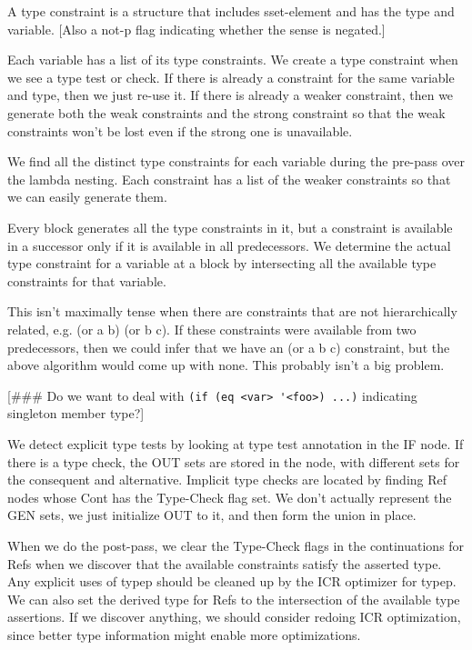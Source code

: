 A type constraint is a structure that includes sset-element and has
the type and variable. [Also a not-p flag indicating whether the sense
is negated.]

Each variable has a list of its type constraints. We create a type
constraint when we see a type test or check. If there is already a
constraint for the same variable and type, then we just re-use it. If
there is already a weaker constraint, then we generate both the weak
constraints and the strong constraint so that the weak constraints
won't be lost even if the strong one is unavailable.

We find all the distinct type constraints for each variable during the pre-pass
over the lambda nesting.  Each constraint has a list of the weaker constraints
so that we can easily generate them.

Every block generates all the type constraints in it, but a constraint is
available in a successor only if it is available in all predecessors.  We
determine the actual type constraint for a variable at a block by intersecting
all the available type constraints for that variable.

This isn't maximally tense when there are constraints that are not
hierarchically related, e.g. (or a b) (or b c).  If these constraints were
available from two predecessors, then we could infer that we have an (or a b c)
constraint, but the above algorithm would come up with none.  This probably
isn't a big problem.

[\#\#\# Do we want to deal with \verb+(if (eq <var> '<foo>) ...)+ indicating singleton
member type?]

We detect explicit type tests by looking at type test annotation in the IF
node.  If there is a type check, the OUT sets are stored in the node, with
different sets for the consequent and alternative.  Implicit type checks are
located by finding Ref nodes whose Cont has the Type-Check flag set.  We don't
actually represent the GEN sets, we just initialize OUT to it, and then form
the union in place.

When we do the post-pass, we clear the Type-Check flags in the continuations
for Refs when we discover that the available constraints satisfy the asserted
type.  Any explicit uses of typep should be cleaned up by the ICR optimizer for
typep.  We can also set the derived type for Refs to the intersection of the
available type assertions.  If we discover anything, we should consider redoing
ICR optimization, since better type information might enable more
optimizations.


